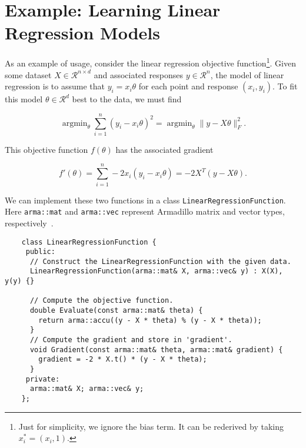\documentclass{article}
\begin{document}
\vspace*{-0.3em}
\section{Example: Learning Linear Regression Models}
\vspace*{-0.5em}

As an example of usage, consider the linear regression objective
function\footnote{Just for simplicity, we ignore the bias term.  It can be
rederived by taking $x^*_i = (x_i, 1)$.}.  Given some dataset $X \in
\mathcal{R}^{n \times d}$ and associated responses $y \in \mathcal{R}^n$, the
model of linear regression is to assume that $y_i = x_i \theta$ for each
point and response $(x_i, y_i)$.  To fit this model $\theta \in \mathcal{R}^d$ best
to the data, we must find

\vspace*{-1.1em}
\begin{equation}
\operatorname{argmin}_\theta \sum_{i = 1}^n (y_i - x_i \theta)^2 =
\operatorname{argmin}_\theta \| y - X \theta \|_F^2.
\end{equation}
\vspace*{-1.1em}

This objective function $f(\theta)$ has the associated gradient

\vspace*{-1.1em}
\begin{equation}
f'(\theta) = \sum_{i = 1}^n -2 x_i (y_i - x_i \theta) = -2 X^T (y - X \theta).
\end{equation}
\vspace*{-1.1em}

We can implement these two functions in a class {\tt LinearRegressionFunction}.
Here {\tt arma::mat} and {\tt arma::vec} represent Armadillo matrix and vector
types, respectively~\cite{sanderson2016armadillo}.

\vspace*{-0.4em}
\begin{verbatim}
    class LinearRegressionFunction {
     public:
      // Construct the LinearRegressionFunction with the given data.
      LinearRegressionFunction(arma::mat& X, arma::vec& y) : X(X), y(y) {}

      // Compute the objective function.
      double Evaluate(const arma::mat& theta) {
        return arma::accu((y - X * theta) % (y - X * theta));
      }
      // Compute the gradient and store in 'gradient'.
      void Gradient(const arma::mat& theta, arma::mat& gradient) {
        gradient = -2 * X.t() * (y - X * theta);
      }
     private:
      arma::mat& X; arma::vec& y;
    };
\end{verbatim}
\vspace*{-0.4em}
\end{document}
